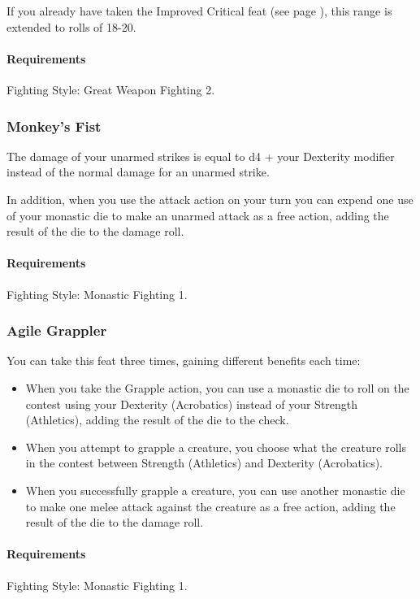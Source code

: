     If you already have taken the Improved Critical feat (see page \pageref{feat::improvedcritical}), this range is extended to rolls of 18-20.
    \paragraph{Requirements} Fighting Style: Great Weapon Fighting 2.
\subsubsection{Monkey's Fist} \label{feat::monkeysfist}
    The damage of your unarmed strikes is equal to d4 + your Dexterity modifier instead of the normal damage for an unarmed strike.

    In addition, when you use the attack action on your turn you can expend one use of your monastic die to make an unarmed attack as a free action, adding the result of the die to the damage roll.
    \paragraph{Requirements} Fighting Style: Monastic Fighting 1.
\subsubsection{Agile Grappler} \label{feat::agilegrappler}
    You can take this feat three times, gaining different benefits each time:
    \begin{itemize}
        \item When you take the Grapple action, you can use a monastic die to roll on the contest using your Dexterity (Acrobatics) instead of your Strength (Athletics), adding the result of the die to the check.
        \item When you attempt to grapple a creature, you choose what the creature rolls in the contest between Strength (Athletics) and Dexterity (Acrobatics).
        \item When you successfully grapple a creature, you can use another monastic die to make one melee attack against the creature as a free action, adding the result of the die to the damage roll.
    \end{itemize}
    \paragraph{Requirements} Fighting Style: Monastic Fighting 1.
